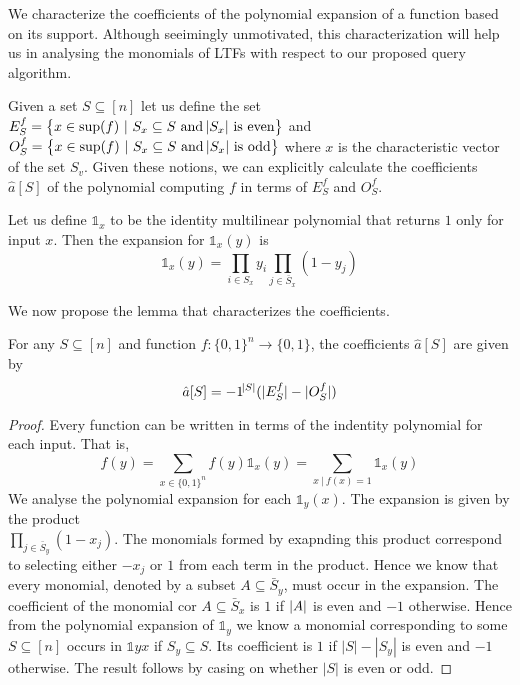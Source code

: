 We characterize the coefficients of the polynomial expansion of a function based on its support. Although seeimingly unmotivated, this characterization will help us in analysing the monomials of LTFs with respect to our proposed query algorithm.

Given a set $S\subseteq [n]$ let us define the set $E^f_S = \set{x\in \sup(f) \ | \ S_x \subseteq S \text{ and $\abs{S_x}$ is even} }$ and $O^f_S = \set{x\in \sup(f) \ | \ S_x \subseteq S \text{ and $\abs{S_x}$ is odd} }$ where $x$ is the characteristic vector of the set $S_v$. Given these notions, we can explicitly calculate the coefficients $\hat{a}[S]$ of the polynomial computing $f$ in terms of $E^f_S$ and $O^f_S$. 

\begin{definition}
	Let us define $\mathds{1}_x$ to be the identity multilinear polynomial that returns $1$ only for input $x$. Then the expansion for $\mathds{1}_x(y)$ is $$\mathds{1}_x(y) = \prod_{i \in S_x} y_i \prod_{j \in \bar{S}_x} (1 - y_j)$$
\end{definition}

We now propose the lemma that characterizes the coefficients. 

\begin{lemma}\label{lemma1}
	For any $S\subseteq [n]$ and function $f: \{0,1\}^n \rightarrow \{0,1\}$, the coefficients $\hat{a}[S]$ are given by 
    \[\hat{a}[S] = -1^{\abs{S}}(\vert E^f_S\vert - \vert O^f_S\vert)\]
	\begin{proof}
		Every function can be written in terms of the indentity polynomial for each input. That is, $$f(y) = \sum_{x \in \{0, 1\}^n} f(y) \mathds{1}_x(y) = \sum_{x \ | \ f(x) = 1} \mathds{1}_x(y)$$
		We analyse the polynomial expansion for each $\mathds{1}_y(x)$. The expansion is given by the product \\ $\prod_{j \in \bar{S}_y} (1 - x_j)$. The monomials formed by exapnding this product correspond to selecting either $-x_j$ or $1$ from each term in the product. Hence we know that every monomial, denoted by a subset $A \subseteq \bar{S}_y$, must occur in the expansion. The coefficient of the monomial cor $A \subseteq\bar{S}_x$ is $1$ if $\vert A\vert$ is even and $-1$ otherwise. Hence from the polynomial expansion of $\mathds{1}_y$ we know a monomial corresponding to some $S \subseteq [n]$ occurs in $\mathds{1}yx$ if $S_y \subseteq S$. Its coefficient is $1$ if $|S| - |S_y|$ is even and $-1$ otherwise. The result follows by casing on whether $|S|$ is even or odd.    
	\end{proof}
\end{lemma} 